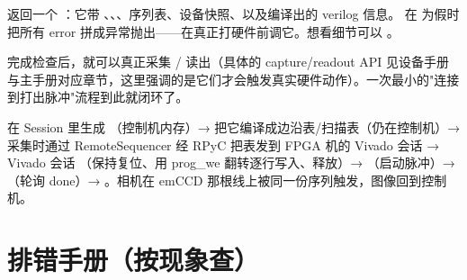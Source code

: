 \documentclass[11pt,oneside,openany]{book}
\begin{document}
 返回一个 ：它带 、、、序列表、设备快照、以及编译出的 verilog 信息。 在  为假时把所有 error 拼成异常抛出——在真正打硬件前调它。想看细节可以 。

完成检查后，就可以真正采集 / 读出（具体的 capture/readout API 见设备手册与主手册对应章节，这里强调的是它们才会触发真实硬件动作）。一次最小的"连接到打出脉冲"流程到此就闭环了。

\begin{notebox}[一次完整闭环的状态流转]
 在 Session 里生成 （控制机内存）→  把它编译成边沿表/扫描表（仍在控制机）→ 采集时通过 RemoteSequencer 经 RPyC 把表发到 FPGA 机的 Vivado 会话 → Vivado 会话 （保持复位、用 prog\_we 翻转逐行写入、释放）→ （启动脉冲）→ （轮询 done）→ 。相机在 emCCD 那根线上被同一份序列触发，图像回到控制机。
\end{notebox}

\section{排错手册（按现象查）}
\end{document}
